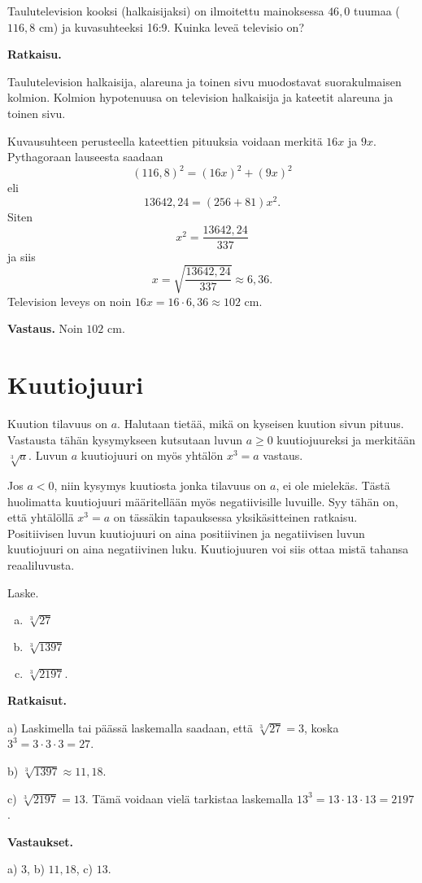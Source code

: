 \begin{esimerkki}
Taulutelevision kooksi (halkaisijaksi) on ilmoitettu mainoksessa $46,0$ tuumaa ($116,8$ cm) ja kuvasuhteeksi 16:9. Kuinka leveä televisio on?

{\bf Ratkaisu.}

Taulutelevision halkaisija, alareuna ja toinen sivu muodostavat suorakulmaisen kolmion. Kolmion hypotenuusa on television halkaisija ja kateetit alareuna ja toinen sivu.

Kuvausuhteen perusteella kateettien pituuksia voidaan merkitä $16x$ ja $9x$. Pythagoraan lauseesta saadaan
\[
(116,8)^2 = (16x)^2 + (9x)^2
\]
eli
\[
13642,24 = (256+81)x^2.
\]
Siten
\[
x^2 = \frac{13642,24}{337}
\]
ja siis
\[
x= \sqrt{\frac{13642,24}{337}} \approx 6,36.
\]
Television leveys on noin $16x = 16\cdot 6,36\approx 102$ cm.

{\bf Vastaus.} Noin $102$ cm.


\end{esimerkki}



\section{Kuutiojuuri}

Kuution tilavuus on $a$. Halutaan tietää, mikä on kyseisen kuution sivun pituus. Vastausta tähän kysymykseen kutsutaan luvun $a\ge 0$ kuutiojuureksi ja merkitään $\sqrt[3]{a}$. Luvun $a$ kuutiojuuri on myös yhtälön $x^3 = a$ vastaus.


Jos $a<0$, niin kysymys kuutiosta jonka tilavuus on $a$, ei ole mielekäs. Tästä huolimatta kuutiojuuri määritellään myös negatiivisille luvuille. Syy tähän on, että yhtälöllä $x^3=a$ on tässäkin tapauksessa yksikäsitteinen ratkaisu. Positiivisen luvun kuutiojuuri on aina positiivinen ja negatiivisen luvun kuutiojuuri on aina negatiivinen luku. Kuutiojuuren voi siis ottaa mistä tahansa reaaliluvusta.


\begin{esimerkki}
Laske.
\begin{enumerate}[a)]
\item $\sqrt[3]{27}$

\item $\sqrt[3]{1397}$

\item $\sqrt[3]{2197}$.
\end{enumerate}

{\bf Ratkaisut.}

a)
Laskimella tai päässä laskemalla saadaan, että $\sqrt[3]{27} = 3$, koska  $3^3 =3\cdot 3\cdot 3=27$.

b) 
$\sqrt[3]{1397}\approx 11,18$. 

c)
$\sqrt[3]{2197}=13$.
Tämä voidaan vielä tarkistaa laskemalla $13^3 = 13\cdot 13\cdot 13=2197$.

{\bf Vastaukset.}

a) $3$, b) $11,18$, c) $13$.
\end{esimerkki}



